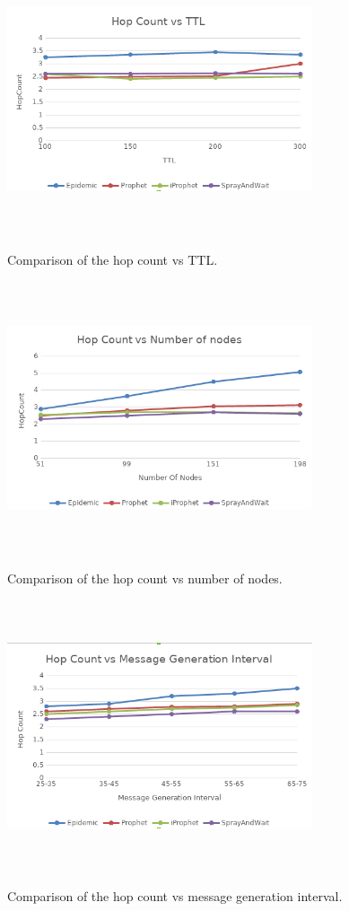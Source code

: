 \documentclass[10pt,journal]{IEEEtran}
\begin{document}
\begin{figure}[H]
\centering
\includegraphics[width=9cm, height=8cm]{hop_count_vs_ttl.png}\\
\caption{Comparison of the hop count vs TTL.}
\label{two}
\end{figure}

\begin{figure}[H]
	\centering
	\includegraphics[width=9cm, height=8cm]{hop_count_vs_num_of_nodes.png}\\
	\caption{Comparison of the hop count vs number of nodes.}
	\label{five}
\end{figure}

\begin{figure}[H]
	\centering
	\includegraphics[width=9cm, height=8cm]{hop_count_vs_msg_gen_interval.png}\\
	\caption{Comparison of the hop count vs message generation interval.}
	\label{nine}
\end{figure}
\end{document}

